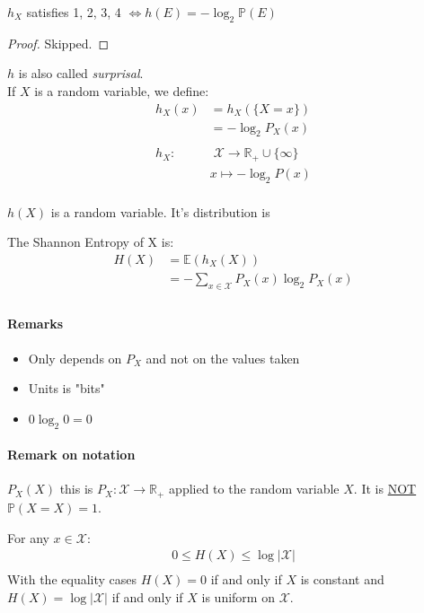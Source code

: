 \begin{prop}
$h_X$ satisfies 1, 2, 3, 4 $\Leftrightarrow h(E)=-\log_2 \mathbb{P}(E)$
\end{prop}

\begin{proof}
Skipped.
\end{proof}

$h$ is also called \textit{surprisal}.\\
If $X$ is a random variable, we define:
\begin{align*}
h_X(x) & = h_X(\{X=x\})\\
& = -\log_2 P_X(x)\\
\\
h_X: & \; \mathcal{X}\to \mathbb{R_+} \cup \{ \infty \}\\
& x \mapsto - \log_2 P(x)\\
\end{align*}

$h(X)$ is a random variable. It's distribution is 


\begin{defi}
The Shannon Entropy of X is:
\begin{align*}
H(X)&=\mathbb{E}(h_X(X))\\
& =  - \sum_{x\in \mathcal{X}} P_X(x) \log_2 P_X(x)\\
\end{align*}

\end{defi}

\paragraph{Remarks}
\begin{itemize}
\item Only depends on $P_X$ and not on the values taken
\item Units is "bits"
\item $0\log_2 0 = 0$
\end{itemize}

\paragraph{Remark on notation}
$P_X(X)$ this is $P_X:\mathcal{X} \to \mathbb{R}_+$ applied to the random variable $X$. It is \underline{NOT} $\mathbb{P}(X=X)=1$.

\begin{prop}
For any $x\in \mathcal{X}$:
\begin{align*}
0\leq H(X) \leq \log |\mathcal{X}|\\
\end{align*}
With the equality cases $H(X)=0$ if and only if $X$ is constant and $H(X)=\log |\mathcal{X}|$ if and only if $X$ is uniform on $\mathcal{X}$.
\end{prop}

